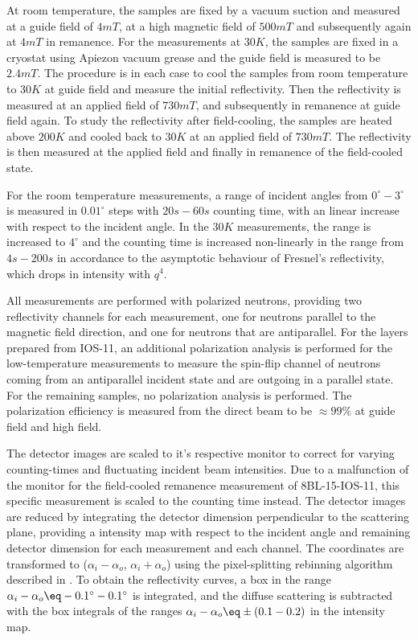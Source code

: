 \documentclass[\main/dresen_thesis.tex]{subfiles}
\begin{document}
    At room temperature, the samples are fixed by a vacuum suction and measured at a guide field of $4 \unit{mT}$, at a high magnetic field of $500 \unit{mT}$ and subsequently again at $4 \unit{mT}$ in remanence.
    For the measurements at $30 \unit{K}$, the samples are fixed in a cryostat using Apiezon vacuum grease and the guide field is measured to be $2.4 \unit{mT}$.
    The procedure is in each case to cool the samples from room temperature to $30 \unit{K}$ at guide field and measure the initial reflectivity.
    Then the reflectivity is measured at an applied field of $730 \unit{mT}$, and subsequently in remanence at guide field again.
    To study the reflectivity after field-cooling, the samples are heated above $200 \unit{K}$ and cooled back to $30 \unit{K}$ at an applied field of $730 \unit{mT}$.
    The reflectivity is then measured at the applied field and finally in remanence of the field-cooled state.

    For the room temperature measurements, a range of incident angles from $0^\circ - 3 ^\circ$ is measured in $0.01 ^\circ$ steps with $20 \unit{s} - 60 \unit{s}$ counting time, with an linear increase with respect to the incident angle.
    In the $30 \unit{K}$ measurements, the range is increased to $4 ^\circ$ and the counting time is increased non-linearly in the range from $4 \unit{s} - 200 \unit{s}$ in accordance to the asymptotic behaviour of Fresnel's reflectivity, which drops in intensity with $q^4$.

    All measurements are performed with polarized neutrons, providing two reflectivity channels for each measurement, one for neutrons parallel to the magnetic field direction, and one for neutrons that are antiparallel.
    For the layers prepared from IOS-11, an additional polarization analysis is performed for the low-temperature measurements to measure the spin-flip channel of neutrons coming from an antiparallel incident state and are outgoing in a parallel state.
    For the remaining samples, no polarization analysis is performed.
    The polarization efficiency is measured from the direct beam to be $\approx 99 \%$ at guide field and high field.

    The detector images are scaled to it's respective monitor to correct for varying counting-times and fluctuating incident beam intensities.
    Due to a malfunction of the monitor for the field-cooled remanence measurement of 8BL-15-IOS-11, this specific measurement is scaled to the counting time instead.
    The detector images are reduced by integrating the detector dimension perpendicular to the scattering plane, providing a intensity map with respect to the incident angle and remaining detector dimension for each measurement and each channel.
    The coordinates are transformed to ($\alpha_i - \alpha_o$, $\alpha_i + \alpha_o$) using the pixel-splitting rebinning algorithm described in .
    To obtain the reflectivity curves, a box in the range $\alpha_i - \alpha_o \eq -0.1 ^\circ - 0.1 ^\circ$ is integrated, and the diffuse scattering is subtracted with the box integrals of the ranges $\alpha_i - \alpha_o \eq \pm (0.1 - 0.2)$ in the intensity map.
\end{document}
